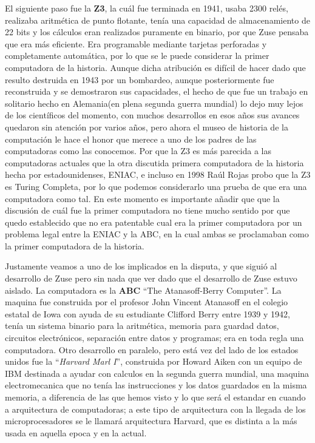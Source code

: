 \documentclass[letterpaper,12pt,oneside]{book}
\begin{document}
		El siguiente paso fue la \textbf{Z3}, la cuál fue terminada en 1941, usaba 2300 relés, realizaba aritmética de punto flotante, tenía una capacidad de
		almacenamiento de 22 bits y	los cálculos eran realizados puramente en binario, por que Zuse pensaba que era más eficiente. Era programable mediante tarjetas
		perforadas y completamente automática, por lo que se le puede considerar la primer computadora de la historia. Aunque dicha atribución es difícil de hacer
		dado que resulto destruida en 1943 por un bombardeo, aunque posteriormente fue reconstruida y se demostraron sus capacidades, el hecho de que fue un trabajo
		en solitario hecho en Alemania(en plena segunda guerra mundial) lo dejo muy lejos de los científicos del momento, con muchos desarrollos en esos años sus
		avances quedaron sin atención por varios años, pero ahora el museo de historia de la computación le hace el honor que merece a uno de los padres
		de las computadoras como las conocemos. Por que la Z3 es más parecida a las computadoras actuales que la otra discutida primera computadora de la historia
		hecha por estadounidenses, ENIAC, e incluso en 1998 Raúl Rojas probo que la Z3 es Turing Completa, por lo que podemos considerarlo una prueba de que era
		una computadora como tal.  En este momento es importante añadir que  que la discusión de cuál fue la primer computadora no tiene mucho sentido por que quedo 
		establecido que	no era patentable cual era la primer computadora por un problema legal entre la ENIAC y la ABC, en la cual ambas se proclamaban como la primer 
		computadora	de la historia.
		
		Justamente veamos a uno de los implicados en la disputa, y que siguió al desarrollo de Zuse pero sin nada que ver dado que el desarrollo de Zuse estuvo
		aislado. La computadora es la \textbf{ABC} ``The Atanasoff-Berry Computer''. La maquina fue construida por el profesor John Vincent Atanasoff 
		en el colegio estatal de Iowa con ayuda de su estudiante Clifford Berry entre 1939 y 1942, tenía un sistema binario para la aritmética, memoria
		para guardad datos, circuitos electrónicos, separación entre datos y programas; era en toda regla una computadora. Otro desarrollo en paralelo, pero
		está vez del lado de los estados unidos fue la ``\textit{Harvard Marl I}'', construida por Howard Aiken con un equipo de IBM destinada a ayudar con calculos
		en la segunda guerra mundial, una maquina electromecanica que no tenía las instrucciones y los datos guardados en la misma memoria, a diferencia de las que hemos
		visto y lo que será el estandar en cuando a arquitectura de computadoras; a este tipo de arquitectura con la llegada de los microprocesadores se le llamará
		arquitectura Harvard, que es distinta a la más usada en aquella epoca y en la actual.
		
\end{document}
